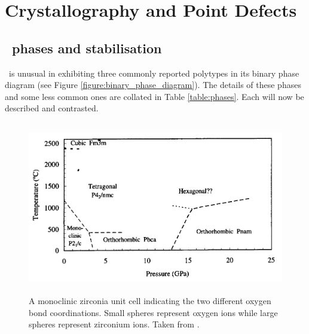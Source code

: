 \chapter{Crystallography and Point Defects}

\label{ch:crystallography}

\section{\zirconia\ phases and stabilisation}

\zirconia\ is unusual in exhibiting three commonly reported polytypes in its binary phase diagram (see Figure \ref{figure:binary_phase_diagram}). The details of these phases and some less common ones are collated in Table \ref{table:phases}. Each will now be described and contrasted.

\begin{figure}[htp] %
\centering
\includegraphics[height=7.5cm]{images/current_phase_diagram.png}
\caption[A monoclinic zirconia unit cell indicating the two different oxygen bond coordinations. Small spheres represent oxygen ions while large spheres represent zirconium ions.]{A monoclinic zirconia unit cell indicating the two different oxygen bond coordinations. Small spheres represent oxygen ions while large spheres represent zirconium ions. Taken from \cite{Xia2010}.
\label{figure:currentphasediagram}}
\end{figure}

